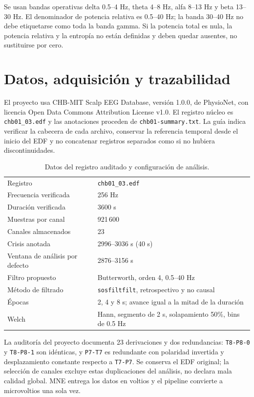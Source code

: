 \documentclass[11pt,a4paper]{article}
\begin{document}
Se usan bandas operativas delta 0.5--4 Hz, theta 4--8 Hz, alfa 8--13 Hz y beta 13--30 Hz. El denominador de potencia relativa es 0.5--40 Hz; la banda 30--40 Hz no debe etiquetarse como toda la banda gamma. Si la potencia total es nula, la potencia relativa y la entropía no están definidas y deben quedar ausentes, no sustituirse por cero.

\section{Datos, adquisición y trazabilidad}
El proyecto usa CHB-MIT Scalp EEG Database, versión 1.0.0, de PhysioNet, con licencia Open Data Commons Attribution License v1.0. El registro núcleo es \texttt{chb01\_03.edf} y las anotaciones proceden de \texttt{chb01-summary.txt}. La guía indica verificar la cabecera de cada archivo, conservar la referencia temporal desde el inicio del EDF y no concatenar registros separados como si no hubiera discontinuidades.

\begin{table}[htbp]\centering
\caption{Datos del registro auditado y configuración de análisis.}
\begin{tabular}{ll}
\toprule
Registro & \texttt{chb01\_03.edf}\\
Frecuencia verificada & 256 Hz\\
Duración verificada & 3600 s\\
Muestras por canal & 921\,600\\
Canales almacenados & 23\\
Crisis anotada & 2996--3036 s (40 s)\\
Ventana de análisis por defecto & 2876--3156 s\\
Filtro propuesto & Butterworth, orden 4, 0.5--40 Hz\\
Método de filtrado & \texttt{sosfiltfilt}, retrospectivo y no causal\\
Épocas & 2, 4 y 8 s; avance igual a la mitad de la duración\\
Welch & Hann, segmento de 2 s, solapamiento 50\%, bins de 0.5 Hz\\
\bottomrule
\end{tabular}
\end{table}

La auditoría del proyecto documenta 23 derivaciones y dos redundancias: \texttt{T8-P8-0} y \texttt{T8-P8-1} son idénticas, y \texttt{P7-T7} es redundante con polaridad invertida y desplazamiento constante respecto a \texttt{T7-P7}. Se conserva el EDF original; la selección de canales excluye estas duplicaciones del análisis, no declara mala calidad global. MNE entrega los datos en voltios y el pipeline convierte a microvoltios una sola vez.
\end{document}
